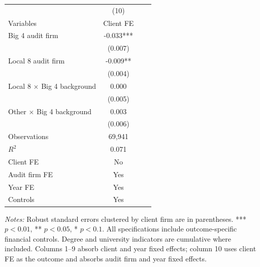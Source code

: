 \documentclass[10pt]{article}
\begin{document}
\begin{minipage}{19cm}\fontsize{10}{12}\selectfont\setlength{\tabcolsep}{4pt}\renewcommand{\arraystretch}{1.12}


\centering
{}
\begin{threeparttable}
\begin{tabular}{p{}ccc}
\toprule
 & (10) &  &  \\
Variables & Client FE &  &  \\
\midrule
Big 4 audit firm & -0.033*** &  &  \\
 & (0.007) &  &  \\
Local 8 audit firm & -0.009** &  &  \\
 & (0.004) &  &  \\
Local 8 $\times$ Big 4 background & 0.000 &  &  \\
 & (0.005) &  &  \\
Other $\times$ Big 4 background & 0.003 &  &  \\
 & (0.006) &  &  \\
Observations & 69,941 &  &  \\
$R^{2}$ & 0.071 &  &  \\
Client FE & No &  &  \\
Audit firm FE & Yes &  &  \\
Year FE & Yes &  &  \\
Controls & Yes &  &  \\
\bottomrule
\end{tabular}
\begin{tablenotes}\fontsize{9}{11}\selectfont
\item \raggedright \fontsize{9}{11}\selectfont \textit{Notes:} Robust standard errors clustered by client firm are in parentheses. *** $p<0.01$, ** $p<0.05$, * $p<0.1$. All specifications include outcome-specific financial controls. Degree and university indicators are cumulative where included.
Columns 1--9 absorb client and year fixed effects; column 10 uses client FE as the outcome and absorbs audit firm and year fixed effects.
\end{tablenotes}
\end{threeparttable}

\end{minipage}
\end{document}
